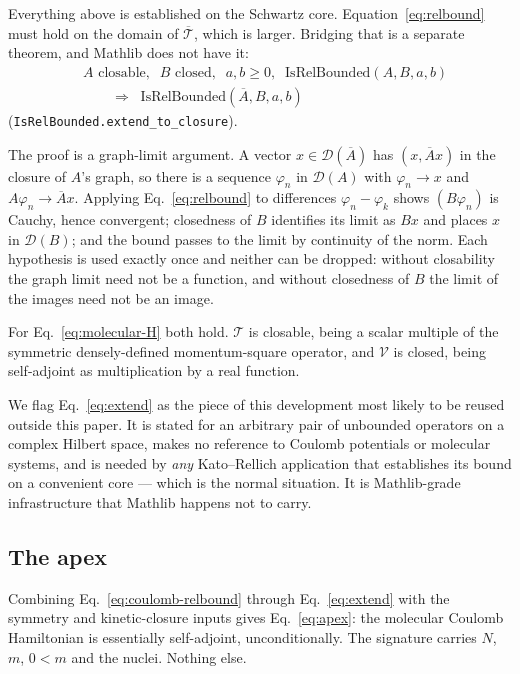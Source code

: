 \documentclass[aps,prd,reprint,nofootinbib,superscriptaddress]{revtex4-2}
\newcommand{\thm}[1]{\texttt{#1}}   %
\begin{document}
Everything above is established on the Schwartz core. Equation~\eqref{eq:relbound} must hold on the
domain of $\overline{\mathcal{T}}$, which is larger. Bridging that is a separate theorem, and Mathlib
does not have it:
\begin{equation}
\begin{split}
&A \text{ closable},\;\; B \text{ closed},\;\; a,b\ge0,\;\;
  \mathrm{IsRelBounded}(A,B,a,b)\\
&\qquad \Longrightarrow\;\; \mathrm{IsRelBounded}(\overline{A},B,a,b)
\end{split}
\label{eq:extend}
\end{equation}
(\thm{IsRelBounded.extend\_to\_closure}).

The proof is a graph-limit argument. A vector $x\in\mathcal{D}(\overline{A})$ has
$(x,\overline{A}x)$ in the closure of $A$'s graph, so there is a sequence $\varphi_{n}$ in
$\mathcal{D}(A)$ with $\varphi_{n}\to x$ and $A\varphi_{n}\to\overline{A}x$. Applying
Eq.~\eqref{eq:relbound} to differences $\varphi_{n}-\varphi_{k}$ shows $(B\varphi_{n})$ is Cauchy,
hence convergent; closedness of $B$ identifies its limit as $Bx$ and places $x$ in $\mathcal{D}(B)$;
and the bound passes to the limit by continuity of the norm. Each hypothesis is used exactly once and
neither can be dropped: without closability the graph limit need not be a function, and without
closedness of $B$ the limit of the images need not be an image.

For Eq.~\eqref{eq:molecular-H} both hold. $\mathcal{T}$ is closable, being a scalar multiple of the
symmetric densely-defined momentum-square operator, and $\mathcal{V}$ is closed, being self-adjoint
as multiplication by a real function.

We flag Eq.~\eqref{eq:extend} as the piece of this development most likely to be reused outside this
paper. It is stated for an arbitrary pair of unbounded operators on a complex Hilbert space, makes no
reference to Coulomb potentials or molecular systems, and is needed by \emph{any} Kato--Rellich
application that establishes its bound on a convenient core --- which is the normal situation. It is
Mathlib-grade infrastructure that Mathlib happens not to carry.

\subsection{The apex}

Combining Eq.~\eqref{eq:coulomb-relbound} through Eq.~\eqref{eq:extend} with the symmetry and
kinetic-closure inputs gives Eq.~\eqref{eq:apex}: the molecular Coulomb Hamiltonian is essentially
self-adjoint, unconditionally. The signature carries $N$, $m$, $0<m$ and the nuclei. Nothing else.
\end{document}
